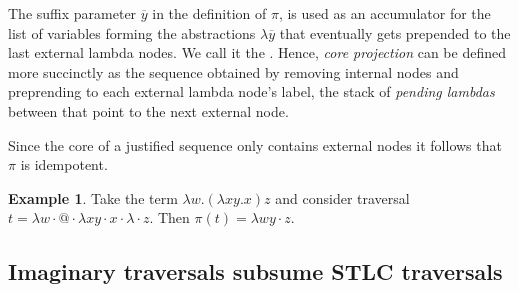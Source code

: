 \documentclass{article}
\theoremstyle{definition}
\newtheorem{example}{Example}[section]
\def\coresymbol{\pi} %
\begin{document}
The suffix parameter $\overline{y}$ in the definition of $\coresymbol$, is used as an accumulator for the list of variables forming the abstractions $\lambda \overline{y}$ that eventually gets prepended to the last external lambda nodes. We call it the . Hence, \emph{core projection} can be defined more succinctly as the sequence obtained by removing internal nodes and preprending to each external lambda node's label, the stack of \emph{pending lambdas} between that point to the next external node.

Since the core of a justified sequence only contains external nodes it follows that $\coresymbol$ is idempotent.

\begin{example}Take the term $\lambda w . (\lambda x y .x) z$ and consider traversal $t = \lambda w\cdot @ \cdot \lambda x y\cdot x\cdot\lambda \cdot z$.
    Then $\coresymbol(t) = \lambda wy \cdot z$.
\end{example}

\subsection{Imaginary traversals subsume STLC traversals}
\end{document}
